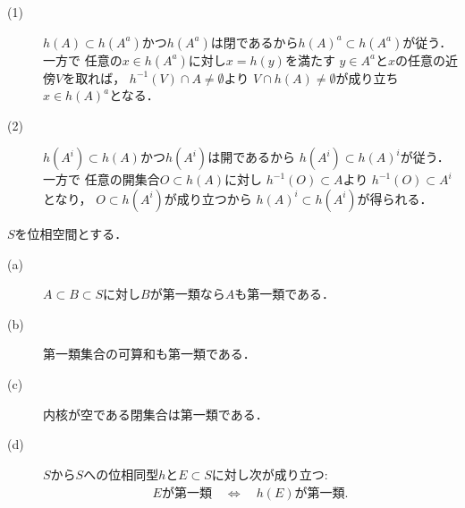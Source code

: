 	\begin{prf}\mbox{}
		\begin{description}
			\item[(1)]
				$h(A) \subset h(A^a)$かつ$h(A^a)$は閉であるから$h(A)^a \subset h(A^a)$が従う．一方で
				任意の$x \in h(A^a)$に対し$x = h(y)$を満たす
				$y \in A^a$と$x$の任意の近傍$V$を取れば，
				$h^{-1}(V) \cap A \neq \emptyset$より
				$V \cap h(A) \neq \emptyset$が成り立ち
				$x \in h(A)^a$となる．
				
			\item[(2)]
				$h(A^i) \subset h(A)$かつ$h(A^i)$は開であるから
				$h(A^i) \subset h(A)^i$が従う．一方で
				任意の開集合$O \subset h(A)$に対し
				$h^{-1}(O) \subset A$より
				$h^{-1}(O) \subset A^i$となり，
				$O \subset h(A^i)$が成り立つから
				$h(A)^i \subset h(A^i)$が得られる．
				\QED
		\end{description}
	\end{prf}
	
	\begin{screen}
		\begin{thm}[第一類集合の性質]
			$S$を位相空間とする．
			\begin{description}
				\item[(a)] $A \subset B \subset S$に対し$B$が第一類なら$A$も第一類である．
				\item[(b)] 第一類集合の可算和も第一類である．
				\item[(c)] 内核が空である閉集合は第一類である．
				\item[(d)] $S$から$S$への位相同型$h$と$E \subset S$に対し次が成り立つ:
					\begin{align}
						\mbox{$E$が第一類} \quad \Longleftrightarrow \quad
						\mbox{$h(E)$が第一類}.
					\end{align}
			\end{description}
		\end{thm}
	\end{screen}
	
